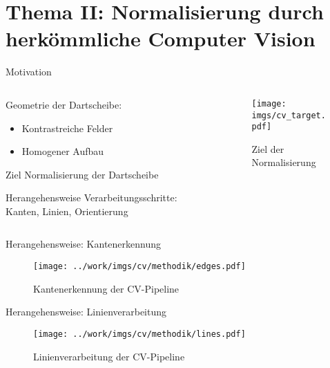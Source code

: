 \section{Thema II: Normalisierung durch herkömmliche Computer Vision}

\begin{frame}{Motivation}

    \begin{columns}
        \begin{column}{0.6\linewidth}

            Geometrie der Dartscheibe:
            \begin{itemize}
                \item Kontrastreiche Felder
                \item Homogener Aufbau
            \end{itemize}

            \begin{block}{Ziel}
                Normalisierung der Dartscheibe
            \end{block}

            \begin{block}{Herangehensweise}
                Verarbeitungsschritte: Kanten, Linien, Orientierung
            \end{block}

        \end{column}
        \begin{column}{0.4\linewidth}
            \begin{figure}
                \centering
                \texttt{[image: imgs/cv\_target.pdf]}
                \caption{Ziel der Normalisierung}
            \end{figure}
        \end{column}
    \end{columns}
\end{frame}

\begin{frame}{Herangehensweise: Kantenerkennung}
    \begin{figure}
        \centering
        \texttt{[image: ../work/imgs/cv/methodik/edges.pdf]}
        \caption{Kantenerkennung der CV-Pipeline}
    \end{figure}
\end{frame}

\begin{frame}{Herangehensweise: Linienverarbeitung}
    \begin{figure}
        \centering
        \texttt{[image: ../work/imgs/cv/methodik/lines.pdf]}
        \caption{Linienverarbeitung der CV-Pipeline}
    \end{figure}
\end{frame}

